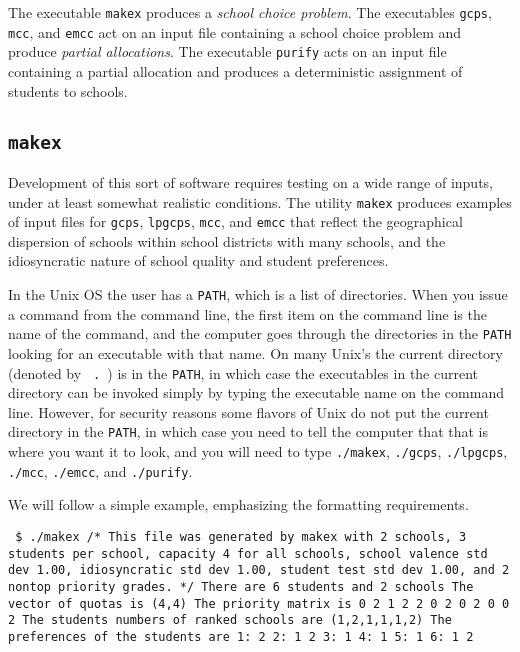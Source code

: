 \documentclass[12pt]{article}
\theoremstyle{definition}
\begin{document}
The executable \texttt{makex} produces a \emph{school choice problem}.
The executables \texttt{gcps}, \texttt{mcc}, and \texttt{emcc} act on
an input file containing a school choice problem and produce
\emph{partial allocations}.  The executable \texttt{purify} acts on an
input file containing a partial allocation and produces a
deterministic assignment of students to schools.

\subsection{\texttt{makex}} \label{subsec:Makex}

Development of this sort of software requires testing on a wide range
of inputs, under at least somewhat realistic conditions.  The utility
\texttt{makex} produces examples of input files for \texttt{gcps},
\texttt{lpgcps}, \texttt{mcc}, and \texttt{emcc} that reflect the
geographical dispersion of schools within school districts with many
schools, and the idiosyncratic nature of school quality and student
preferences.

In the Unix OS the user has a \texttt{PATH}, which is a list of
directories.  When you issue a command from the command line, the
first item on the command line is the name of the command, and the
computer goes through the directories in the \texttt{PATH} looking for
an executable with that name.  On many Unix's the current directory
(denoted by \texttt{\ .\ }) is in the \texttt{PATH}, in which case the
executables in the current directory can be invoked simply by typing
the executable name on the command line.  However, for security
reasons some flavors of Unix do not put the current directory in the
\texttt{PATH}, in which case you need to tell the computer that that
is where you want it to look, and you will need to type
\texttt{./makex}, \texttt{./gcps}, \texttt{./lpgcps}, \texttt{./mcc},
\texttt{./emcc}, and \texttt{./purify}.

We will follow a simple example, emphasizing the formatting requirements.
\begin{obeylines}\texttt{
    \$ ./makex
/* This file was generated by makex with 2 schools,
3 students per school, capacity 4 for all schools,
school valence std dev 1.00, idiosyncratic std dev 1.00,
student test std dev 1.00, and 2 nontop priority grades. */
There are 6 students and 2 schools
The vector of quotas is (4,4)
The priority matrix is
    0    2
    1    2
    2    0
    2    0
    2    0
    0    2
The students numbers of ranked schools are
(1,2,1,1,1,2)
The preferences of the students are
1:    2
2:    1   2
3:    1
4:    1
5:    1
6:    1   2
  }
\end{obeylines}
\end{document}

